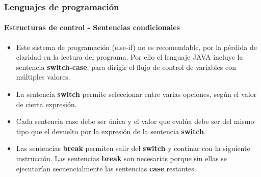 \documentclass{beamer}
\begin{document}
\begin{frame}
  \frametitle{Lenguajes de programación}
  \framesubtitle{Estructuras de control - Sentencias condicionales}

  \begin{itemize}
  \item Este sistema de programación (else-if) no es recomendable, por la pérdida de claridad en la lectura del programa. Por ello el lenguaje JAVA incluye la sentencia \textbf{switch-case}, para dirigir el flujo de control de variables con múltiples valores.
  \item La sentencia \textbf{switch} permite seleccionar entre varias opciones, según el valor de cierta expresión.
  \item Cada sentencia case debe ser única y el valor que evalúa debe ser del mismo tipo que el devuelto por la expresión de la sentencia \textbf{switch}.
  \item Las sentencias \textbf{break} permiten salir del \textbf{switch} y continar con la siguiente instrucción. Las sentencias \textbf{break} son necesarias porque sin ellas se ejecutarían secuencialmente las sentencias \textbf{case} restantes. 
  \end{itemize}
\end{frame}
\end{document}
